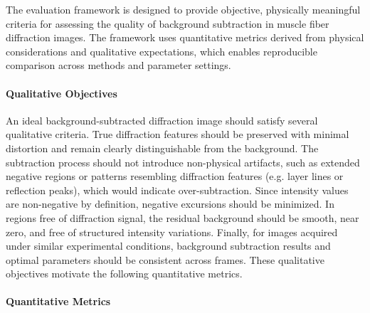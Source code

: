 \documentclass[iucr]{iucrjournals}
\begin{document}
The evaluation framework is designed to provide objective, physically meaningful criteria for assessing the quality of background subtraction in muscle fiber diffraction images. The framework uses quantitative metrics derived from physical considerations and qualitative expectations, which enables reproducible comparison across methods and parameter settings.

\paragraph{Qualitative Objectives}

An ideal background-subtracted diffraction image should satisfy several qualitative criteria. True diffraction features should be preserved with minimal distortion and remain clearly distinguishable from the background. The subtraction process should not introduce non-physical artifacts, such as extended negative regions or patterns resembling diffraction features (e.g. layer lines or reflection peaks), which would indicate over-subtraction. Since intensity values are non-negative by definition, negative excursions should be minimized. In regions free of diffraction signal, the residual background should be smooth, near zero, and free of structured intensity variations. Finally, for images acquired under similar experimental conditions, background subtraction results and optimal parameters should be consistent across frames. These qualitative objectives motivate the following quantitative metrics.

\paragraph{Quantitative Metrics}
\end{document}

